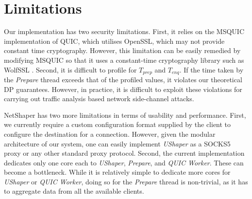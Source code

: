 \section{Limitations}
\label{sec:netshaper-limitations}

Our implementation has two security limitations.
First, it relies on the MSQUIC implementation of QUIC, which utilises OpenSSL, which may not provide constant time cryptography.
However, this limitation can be easily remedied by modifying MSQUIC so that it uses a constant-time cryptography library such as WolfSSL \cite{wolfssl}.
Second, it is difficult to profile for $T_{prep}$ and $T_{enq}$. 
If the time taken by the \textit{Prepare} thread exceeds that of the profiled values, it violates our theoretical DP guarantees. 
However, in practice, it is difficult to exploit these violations for carrying out traffic analysis based network side-channel attacks.

NetShaper has two more limitations in terms of usability and performance.
First, we currently require a custom configuration format supplied by the client to configure the destination for a connection. 
However, given the modular architecture of our system, one can easily implement \textit{UShaper} as a SOCKS5 proxy \cite{leech1996socks} or any other standard proxy protocol.
Second, the current implementation dedicates only one core each to \textit{UShaper}, \textit{Prepare}, and \textit{QUIC Worker}. These can become a bottleneck. 
While it is relatively simple to dedicate more cores for \textit{UShaper} or \textit{QUIC Worker}, doing so for the \textit{Prepare} thread is non-trivial, as it has to aggregate data from all the available clients.